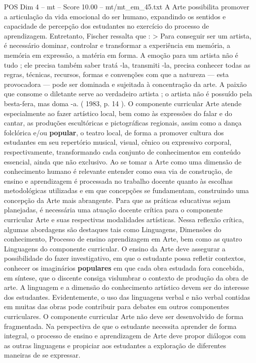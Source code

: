 \begin{textsample}{POS Dim 4 – mt – Score 10.00 – mt/mt\_em\_45.txt}
A Arte possibilita promover a articulação da vida emocional do ser humano, expandindo os sentidos e capacidade de percepção dos estudantes no exercício do processo de aprendizagem.
Entretanto, Fischer ressalta que : > Para conseguir ser um artista, é necessário dominar, controlar e transformar a experiência em memória, a memória em expressão, a matéria em forma.
A emoção para um artista não é tudo ; ele precisa também saber tratá -la, transmiti -la, precisa conhecer todas as regras, técnicas, recursos, formas e convenções com que a natureza — esta provocadora — pode ser dominada e sujeitada à concentração da arte.
A paixão que consome o diletante serve ao verdadeiro artista ; o artista não é possuído pela besta-fera, mas doma -a. ( 1983, p. 14 ).
O componente curricular Arte atende especialmente ao fazer artístico local, bem como às expressões do falar e do cantar, as produções escultóricas e pictográficas regionais, assim como a dança folclórica e/ou \textbf{popular}, o teatro local, de forma a promover cultura dos estudantes em seu repertório musical, visual, cênico ou expressivo corporal, respectivamente, transformando cada conjunto de conhecimentos em conteúdo essencial, ainda que não exclusivo.
Ao se tomar a Arte como uma dimensão de conhecimento humano é relevante entender como essa via de construção, de ensino e aprendizagem é processada no trabalho docente quanto às escolhas metodológicas utilizadas e em que concepções se fundamentam, construindo uma concepção da Arte mais abrangente.
Para que as práticas educativas sejam planejadas, é necessária uma atuação docente crítica para o componente curricular Arte e suas respectivas modalidades artísticas.
Nessa reflexão crítica, algumas abordagens são destaques tais como Linguagens, Dimensões do conhecimento, Processo de ensino aprendizagem em Arte, bem como as quatro Linguagens do componente curricular.
O ensino da Arte deve assegurar a possibilidade do fazer investigativo, em que o estudante possa refletir contextos, conhecer os imaginários \textbf{populares} em que cada obra estudada fora concebida, em síntese, que o discente consiga vislumbrar o contexto de produção da obra de arte.
A linguagem e a dimensão do conhecimento artístico devem ser do interesse dos estudantes.
Evidentemente, o uso das linguagens verbal e não verbal contidas em muitas das obras pode contribuir para debates em outros componentes curriculares.
O componente curricular Arte não deve ser desenvolvido de forma fragmentada.
Na perspectiva de que o estudante necessita aprender de forma integral, o processo de ensino e aprendizagem de Arte deve propor diálogos com as outras linguagens e propiciar aos estudantes a exploração de diferentes maneiras de se expressar.

\end{textsample}
